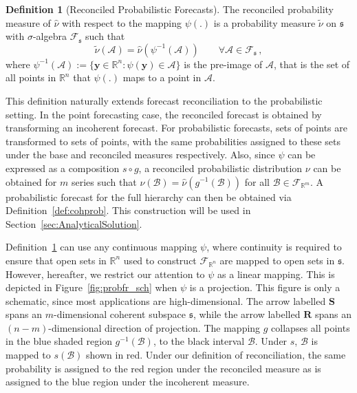 \documentclass[a4paper,12pt]{article}
\theoremstyle{definition}
\newtheorem{definition}{Definition}[section]
\begin{document}
\begin{definition}[Reconciled Probabilistic Forecasts] \label{def:reconprob}
	The reconciled probability measure of $\hat{\nu}$ with respect to the mapping $\psi(.)$ is a probability measure $\tilde{\nu}$ on $\mathfrak{s}$ with $\sigma$-algebra $\mathscr{F}_\mathfrak{s}$ such that
	\[
	\tilde{\nu}(\mathcal{A}) = \hat{\nu}(\psi^{-1}(\mathcal{A})) \qquad \forall \mathcal{A} \in \mathscr{F}_{\mathfrak{s}}\,,
	\]
	where $\psi^{-1}(\mathcal{A}):=\{{\bm{y}}\in \mathbb{R}^n:\psi({\bm{y}})\in \mathcal{A}\}$ is the pre-image of $\mathcal{A}$, that is the set of all points in $\mathbb{R}^n$ that $\psi(.)$ maps to a point in $\mathcal{A}$.
\end{definition}

This definition naturally extends forecast reconciliation to the probabilistic setting. In the point forecasting case, the reconciled forecast is obtained by transforming an incoherent forecast. For probabilistic forecasts, sets of points are transformed to sets of points, with the same probabilities assigned to these sets under the base and reconciled measures respectively. Also, since $\psi$ can be expressed as a composition $s\circ g$, a reconciled probabilistic distribution $\nu$ can be obtained for $m$ series such that $\nu(\mathcal{B})= \hat{\nu}(g^{-1}(\mathcal{B}))$ for all $\mathcal{B} \in \mathscr{F}_{\mathbb{R}^m}$. A probabilistic forecast for the full hierarchy can then be obtained via Definition~\ref{def:cohprob}. This construction will be used in Section~\ref{sec:AnalyticalSolution}.

Definition~\ref{def:reconprob} can use any continuous mapping $\psi$, where continuity is required to ensure that open sets in $\mathbb{R}^n$ used to construct $\mathscr{F}_{\mathbb{R}^n}$ are mapped to open sets in $\mathfrak{s}$. However, hereafter, we restrict our attention to $\psi$ as a linear mapping. This is depicted in Figure~\ref{fig:probfr_sch} when $\psi$ is a projection. This figure is only a schematic, since most applications are high-dimensional. The arrow labelled $\bm{S}$ spans an $m$-dimensional coherent subspace $\mathfrak{s}$, while the arrow labelled $\bm{R}$ spans an $(n-m)$-dimensional direction of projection. The mapping $g$ collapses all points in the blue shaded region $g^{-1}(\mathcal{B})$, to the black interval $\mathcal{B}$. Under $s$, $\mathcal{B}$ is mapped to $s(\mathcal{B})$ shown in red. Under our definition of reconciliation, the same probability is assigned to the red region under the reconciled measure as is assigned to the blue region under the incoherent measure.
\end{document}

